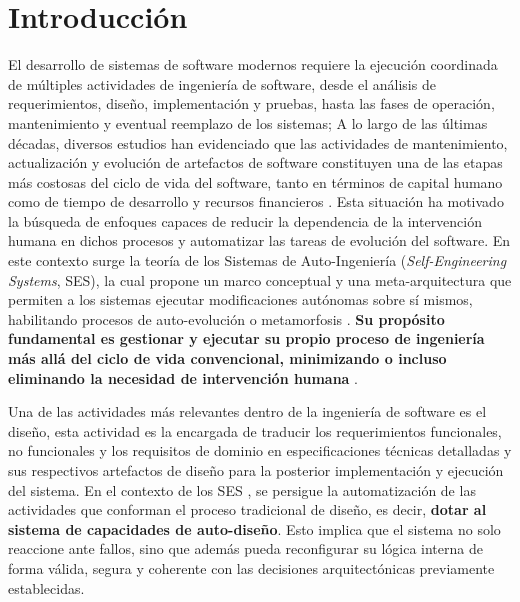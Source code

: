 \documentclass[12pt, letterpaper, oneside]{book}
\begin{document}
\mainmatter

\chapter{Introducción}\label{introduccion}
El desarrollo de sistemas de software modernos requiere la ejecución coordinada de múltiples actividades de ingeniería de software, desde el análisis de requerimientos, diseño, implementación y pruebas, hasta las fases de operación, mantenimiento y eventual reemplazo de los sistemas; A lo largo de las últimas décadas, diversos estudios han evidenciado que las actividades de mantenimiento, actualización y evolución de artefactos de software constituyen una de las etapas más costosas del ciclo de vida del software, tanto en términos de capital humano como de tiempo de desarrollo y recursos financieros \cite{thefinancial2015Areti,contemporanysoftware2025wesley}. Esta situación ha motivado la búsqueda de enfoques capaces de reducir la dependencia de la intervención humana en dichos procesos y automatizar las tareas de evolución del software.
En este contexto surge la teoría de los Sistemas de Auto-Ingeniería (\textit{Self-Engineering Systems}, SES), la cual propone un marco conceptual y una meta-arquitectura que permiten a los sistemas ejecutar modificaciones autónomas sobre sí mismos, habilitando procesos de auto-evolución o metamorfosis \cite{perez2024}. \textbf{Su propósito fundamental es gestionar y ejecutar su propio proceso de ingeniería más allá del ciclo de vida convencional, minimizando o incluso eliminando la necesidad de intervención humana} \cite{PerezCarrillo2026}.

Una de las actividades más relevantes dentro de la ingeniería de software es el diseño, esta actividad es la encargada de traducir los requerimientos funcionales, no funcionales y los requisitos de dominio en especificaciones técnicas detalladas y sus respectivos artefactos de diseño para la posterior implementación y ejecución del sistema. En el contexto de los SES \cite{PerezCarrillo2026}, se persigue la automatización de las actividades que conforman el proceso tradicional de diseño, es decir, \textbf{dotar al sistema de capacidades de auto-diseño}. Esto implica que el sistema no solo reaccione ante fallos, sino que además pueda reconfigurar su lógica interna de forma válida, segura y coherente con las decisiones arquitectónicas previamente establecidas.
\end{document}
